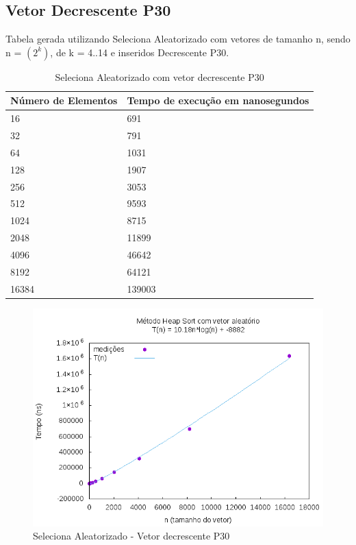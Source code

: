 \documentclass[12pt,a4paper,twoside]{report}
\begin{document}
\subsection{Vetor Decrescente P30}
Tabela gerada utilizando Seleciona Aleatorizado com vetores de tamanho n, sendo n = $(2^k)$, de k = 4..14 e inseridos Decrescente P30.
\begin{table}[H]
\centering
\caption{Seleciona Aleatorizado com vetor decrescente P30}
\label{my-label}
\begin{tabular}{|l|l|}
\hline
\multicolumn{1}{|c|}{\textbf{Número de Elementos}} & \multicolumn{1}{c|}{\textbf{Tempo de execução em nanosegundos}} \\ \hline
16 & 691 \\ \hline
32 & 791 \\ \hline
64 & 1031 \\ \hline
128 & 1907 \\ \hline
256 & 3053 \\ \hline
512 & 9593 \\ \hline
1024 & 8715 \\ \hline
2048 & 11899 \\ \hline
4096 & 46642 \\ \hline
8192 & 64121 \\ \hline
16384 & 139003 \\ \hline

\end{tabular}
\end{table}

\begin{figure}[H]
    \centering
    \includegraphics[width=0.7\linewidth]{graficos/HeapSort/vIntAleatorio/vIntAleatorio.png}
  \caption{Seleciona Aleatorizado - Vetor decrescente P30}
\end{figure}
\end{document}
